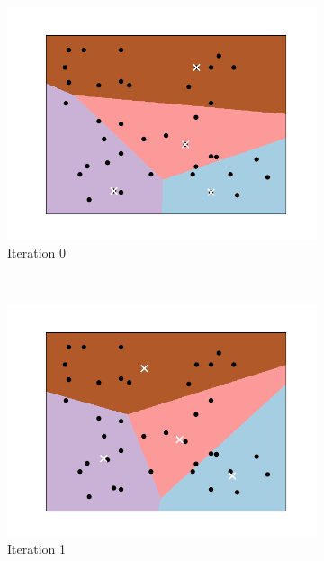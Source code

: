 \documentclass[a4paper, 12pt]{article}
\numberwithin{equation}{section}
\numberwithin{figure}{section}
\theoremstyle{definition}
\begin{document}
\begin{figure}[t]
	\centering 
	\begin{subfigure}[b]{0.49\textwidth}
		\centering 
		\includegraphics[scale=0.4]{graphics/k_means_iter0_alt.png}
		\vspace{-0.75em}
		\caption{Iteration 0}
	\end{subfigure}~%
	\begin{subfigure}[b]{0.49\textwidth}
		\centering 
		\includegraphics[scale=0.4]{graphics/k_means_iter1_alt.png}
		\vspace{-0.75em}
		\caption{Iteration 1}
	\end{subfigure}
	\begin{subfigure}[b]{0.49\textwidth}

\end{subfigure}
\end{figure}
\end{document}
